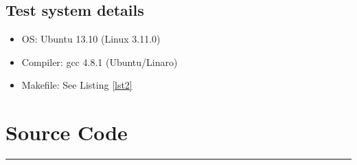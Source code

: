 \documentclass[pdftex, a4paper,12pt]{article}
\begin{document}
\subsection{Test system details}

\begin{itemize}
	\item OS: Ubuntu 13.10 (Linux 3.11.0)
	\item Compiler: gcc 4.8.1 (Ubuntu/Linaro)
	\item Makefile: See Listing \ref{lst2}
\end{itemize}


\clearpage
\section{Source Code}


\hrule

\end{document}
